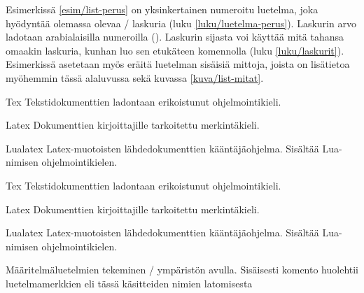 Esimerkissä \ref{esim/list-perus} on yksinkertainen numeroitu luetelma,
joka hyödyntää olemassa olevaa \-/ laskuria (luku
\ref{luku/luetelma-perus}). Laskurin arvo ladotaan arabialaisilla
numeroilla (). Laskurin  sijasta voi
käyttää mitä tahansa omaakin laskuria, kunhan luo sen etukäteen
komennolla  (luku \ref{luku/laskurit}). Esimerkissä
asetetaan myös eräitä luetelman sisäisiä mittoja, joista on lisätietoa
myöhemmin tässä alaluvussa sekä kuvassa \ref{kuva/list-mitat}.

\begin{esimerkki*}

\begin{koodilohko}
\begin{list}{}{
    \renewcommand{\makelabel}[1]{\textsc{#1:}}
    \setlength{\leftmargin}{1.5em}
    \setlength{\labelwidth}{1.5em}
    \setlength{\itemindent}{1em}
    \setlength{\labelsep}{1em}
    \setlength{\itemsep}{.2ex}
  }
\item[Tex] Tekstidokumenttien ladontaan erikoistunut ohjelmointikieli.
\item[Latex] Dokumenttien kirjoittajille tarkoitettu merkintäkieli.
\item[Lualatex] Latex-muotoisten lähdedokumenttien kääntäjäohjelma.
  Sisältää Lua-nimi\-sen ohjelmointikielen.
\end{list}
\end{koodilohko}
  \begin{tulos}
    \begin{list}{}{
        \renewcommand{\makelabel}[1]{\textsc{#1:}}
        \setlength{\leftmargin}{1.5em}
        \setlength{\labelwidth}{1.5em}
        \setlength{\itemindent}{1em}
        \setlength{\labelsep}{1em}
        \setlength{\itemsep}{.2ex}
      }
    \item[Tex] Tekstidokumenttien ladontaan erikoistunut ohjelmointikieli.
    \item[Latex] Dokumenttien kirjoittajille tarkoitettu merkintäkieli.
    \item[Lualatex] Latex-muotoisten lähdedokumenttien kääntäjäohjelma.
      Sisältää Lua-nimi\-sen ohjelmointikielen.
    \end{list}
  \end{tulos}
  \caption{Määritelmäluetelmien tekeminen \-/ ympäristön
    avulla. Sisäisesti komento  huolehtii
    luetelmamerkkien eli tässä käsitteiden nimien latomisesta}
  \label{esim/list-makelabel}
\end{esimerkki*}

